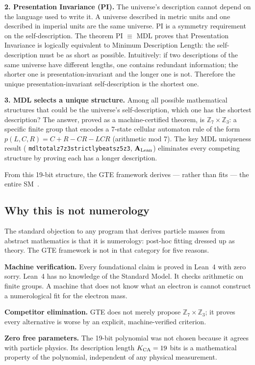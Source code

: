 \documentclass[11pt,a4paper]{article}
\newcommand{\lean}[1]{%
  \penalty-100
  \begingroup\def\_{\textunderscore\allowbreak}\texttt{#1}\endgroup}
\newcommand{\CatAL}{\ensuremath{\mathbf{A}_{\rm Lean}}}
\begin{document}
\textbf{2. Presentation Invariance (PI).}
The universe's description cannot depend on the language used to write it.
A universe described in metric units and one described in imperial units
are the same universe.
PI is a symmetry requirement on the self-description.
The theorem PI $\equiv$ MDL proves that Presentation Invariance is logically
equivalent to Minimum Description Length: the self-description must be
as short as possible.
Intuitively: if two descriptions of the same universe have different lengths,
one contains redundant information; the shorter one is presentation-invariant
and the longer one is not.
Therefore the unique presentation-invariant self-description is the shortest one.

\textbf{3. MDL selects a unique structure.}
Among all possible mathematical structures that could be the universe's
self-description, which one has the shortest description?
The answer, proved as a machine-certified theorem, is
$\mathbb{Z}_7 \times \mathbb{Z}_3$: a specific finite group
that encodes a 7-state cellular automaton rule of the form
$p(L,C,R) = C + R - CR - LCR$ (arithmetic mod 7).
The key MDL uniqueness result
(\lean{mdl\_total\_z7z3\_strictly\_beats\_z5z3}, \CatAL)
eliminates every competing structure by proving each has a longer description.

From this 19-bit structure, the GTE framework derives --- rather than fits ---
the entire SM~\cite{SpivackGTECompleteFramework,SpivackSM}.

\subsection{Why this is not numerology}

The standard objection to any program that derives particle masses from
abstract mathematics is that it is numerology: post-hoc fitting dressed up
as theory.
The GTE framework is not in that category for five reasons.

\textbf{Machine verification.}
Every foundational claim is proved in Lean~4 with zero sorry.
Lean~4 has no knowledge of the Standard Model.
It checks arithmetic on finite groups.
A machine that does not know what an electron is cannot construct a
numerological fit for the electron mass.

\textbf{Competitor elimination.}
GTE does not merely propose $\mathbb{Z}_7 \times \mathbb{Z}_3$; it proves
every alternative is worse by an explicit, machine-verified criterion.

\textbf{Zero free parameters.}
The 19-bit polynomial was not chosen because it agrees with particle physics.
Its description length $K_{\rm CA} = 19$ bits is a mathematical property
of the polynomial, independent of any physical measurement.
\end{document}
